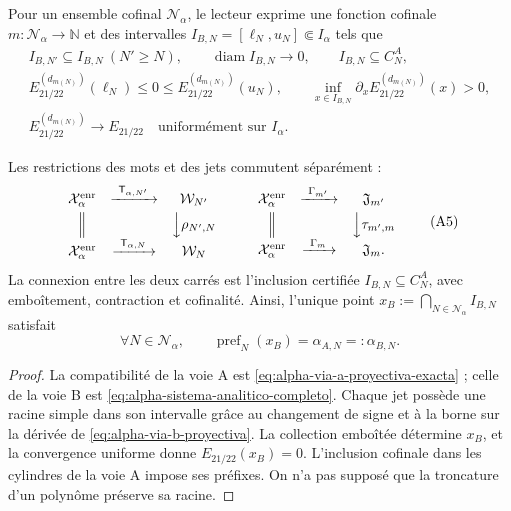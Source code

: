 Pour un ensemble cofinal \(\mathcal N_\alpha\), le lecteur exprime une fonction cofinale \(m:\mathcal N_\alpha\to\mathbb N\) et des intervalles \(I_{B,N}=[\ell_N,u_N]\Subset I_\alpha\) tels que
\begin{equation}
\begin{gathered}
 I_{B,N'}\subseteq I_{B,N}\ (N'\ge N),\qquad
 \operatorname{diam}I_{B,N}\longrightarrow0,\qquad
 I_{B,N}\subseteq C_N^A,\\
 E_{21/22}^{(d_{m(N)})}(\ell_N)\le0\le
 E_{21/22}^{(d_{m(N)})}(u_N),\qquad
 \inf_{x\in I_{B,N}}\partial_xE_{21/22}^{(d_{m(N)})}(x)>0,\\
 E_{21/22}^{(d_{m(N)})}\longrightarrow E_{21/22}
 \quad\text{uniformément sur }I_\alpha .
\end{gathered}
 \tag{A4}
 \label{eq:alpha-via-b-proyectiva}
\end{equation}

\begin{proposition}
\label{prop:alpha-cuadrados-compatibilidad}
Les restrictions des mots et des jets commutent séparément :
\[
\begin{array}{ccc}
 \mathcal X_\alpha^{\mathrm{enr}}&
 \xrightarrow{\ \mathsf T_{\alpha,N'}\ }&\mathcal W_{N'}\\[1mm]
 \Big\Vert&&\Big\downarrow\rho_{N',N}\\[1mm]
 \mathcal X_\alpha^{\mathrm{enr}}&
 \xrightarrow{\ \mathsf T_{\alpha,N}\ }&\mathcal W_N
\end{array}
\qquad
\begin{array}{ccc}
 \mathcal X_\alpha^{\mathrm{enr}}&
 \xrightarrow{\ \Gamma_{m'}\ }&\mathfrak J_{m'}\\[1mm]
 \Big\Vert&&\Big\downarrow\tau_{m',m}\\[1mm]
 \mathcal X_\alpha^{\mathrm{enr}}&
 \xrightarrow{\ \Gamma_m\ }&\mathfrak J_m .
\end{array}
 \tag{A5}
\]
La connexion entre les deux carrés est l'inclusion certifiée \(I_{B,N}\subseteq C_N^A\), avec emboîtement, contraction et cofinalité. Ainsi, l'unique point \(x_B:=\bigcap_{N\in\mathcal N_\alpha}I_{B,N}\) satisfait
\begin{equation}
 \forall N\in\mathcal N_\alpha,\qquad
 \operatorname{pref}_N(x_B)=\alpha_{A,N}=:\alpha_{B,N}.
 \tag{A6}
 \label{eq:alpha-igualdad-cada-nivel}
\end{equation}
\end{proposition}

\begin{proof}
La compatibilité de la voie A est \eqref{eq:alpha-via-a-proyectiva-exacta} ; celle de la voie B est \eqref{eq:alpha-sistema-analitico-completo}. Chaque jet possède une racine simple dans son intervalle grâce au changement de signe et à la borne sur la dérivée de \eqref{eq:alpha-via-b-proyectiva}. La collection emboîtée détermine \(x_B\), et la convergence uniforme donne \(E_{21/22}(x_B)=0\). L'inclusion cofinale dans les cylindres de la voie A impose ses préfixes. On n'a pas supposé que la troncature d'un polynôme préserve sa racine.
\end{proof}

